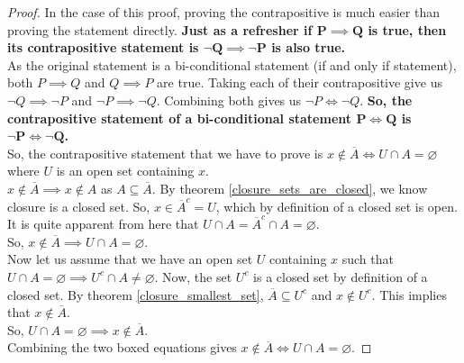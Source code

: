 \begin{proof}
    In the case of this proof, proving the contrapositive is much easier than proving the statement directly. \textbf{Just as a refresher if $\pmb{P\implies Q}$ is true, then its contrapositive statement is $\pmb{\neg Q\implies\neg P}$ is also true.}\\
    As the original statement is a bi-conditional statement (if and only if statement), both $P\implies Q$ and $Q\implies P$ are true. Taking each of their contrapositive give us $\neg Q\implies\neg P$ and $\neg P\implies \neg Q$. Combining both gives us $\neg P\iff\neg Q$. \textbf{So, the contrapositive statement of a bi-conditional statement $\pmb{P\iff Q}$ is $\pmb{\neg P\iff \neg Q}$.} \\
    So, the contrapositive statement that we have to prove is $x\notin \overline{A}\iff U\cap A=\varnothing$ where $U$ is an open set containing $x$.\\
    $x\notin\overline{A}\implies x\notin A$ as $A\subseteq\overline{A}$. By theorem \eqref{closure_sets_are_closed}, we know closure is a closed set. So, $x\in\overline{A}^c=U$, which by definition of a closed set is open. It is quite apparent from here that $U\cap A=\overline{A}^c\cap A=\varnothing$.\\ So, $\boxed{x\notin\overline{A}\implies U\cap A=\varnothing}$.\\
    Now let us assume that we have an open set $U$ containing $x$ such that $U\cap A=\varnothing\implies U^c\cap A\neq\varnothing$. Now, the set $U^c$ is a closed set by definition of a closed set. By theorem \eqref{closure_smallest_set}, $\overline{A}\subseteq U^c$ and $x\notin U^c$. This implies that $x\notin\overline{A}$.\\ So, $U\cap A=\varnothing\implies x\notin\overline{A}$.\\ Combining the two boxed equations gives $x\notin\overline{A}\iff U\cap A=\varnothing$.
\end{proof}
